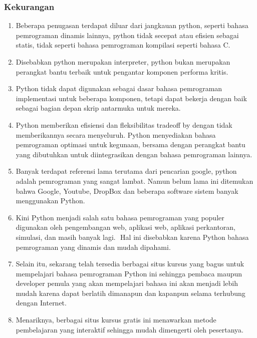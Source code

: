 \subsubsection{Kekurangan}
\begin{enumerate}
\item Beberapa penugasan terdapat diluar dari jangkauan python, seperti bahasa pemrograman dinamis lainnya, python tidak secepat atau efisien sebagai statis, tidak seperti bahasa pemrograman kompilasi seperti bahasa C.
\item Disebabkan python merupakan interpreter, python bukan merupakan perangkat bantu terbaik untuk pengantar komponen performa kritis.
\item Python tidak dapat digunakan sebagai dasar bahasa pemrograman implementasi untuk beberapa komponen, tetapi dapat bekerja dengan baik sebagai bagian depan skrip antarmuka untuk mereka.
\item Python memberikan efisiensi dan fleksibilitas tradeoff by dengan tidak memberikannya secara menyeluruh. Python menyediakan bahasa pemrograman optimasi untuk kegunaan, bersama dengan perangkat bantu yang dibutuhkan untuk diintegrasikan dengan bahasa pemrograman lainnya.
\item Banyak terdapat referensi lama terutama dari pencarian google, python adalah pemrograman yang sangat lambat. Namun belum lama ini ditemukan bahwa Google, Youtube, DropBox dan beberapa software sistem banyak menggunakan Python.
\item Kini Python menjadi salah satu bahasa pemrograman yang populer digunakan oleh pengembangan $  $web, aplikasi $  $web, aplikasi perkantoran, simulasi, dan masih banyak lagi. $  $ Hal ini disebabkan karena Python bahasa pemrograman yang dinamis dan mudah dipahami.
\item Selain itu, sekarang telah tersedia berbagai situs kursus yang bagus untuk mempelajari bahasa pemrograman Python ini sehingga pembaca maupun developer pemula yang akan mempelajari bahasa ini akan menjadi lebih mudah karena dapat berlatih dimanapun dan kapanpun selama terhubung dengan Internet.
\item Menariknya, berbagai situs kursus gratis ini menawarkan metode pembelajaran yang interaktif sehingga mudah dimengerti oleh pesertanya.
\end{enumerate}

